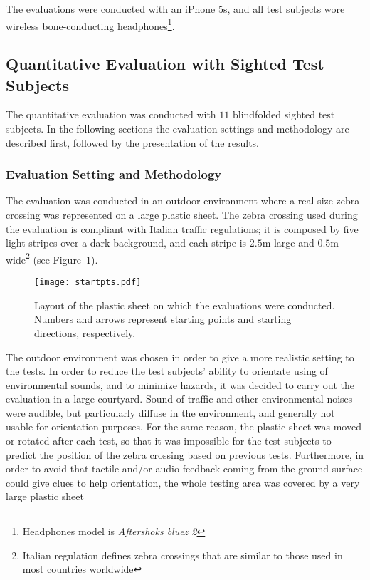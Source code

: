 \documentclass{article}
\begin{document}
The evaluations were conducted with an iPhone $5$s, and all test subjects wore wireless bone-conducting headphones\footnote{Headphones model is \emph{Aftershoks bluez 2}}.

\subsection{Quantitative Evaluation with Sighted Test Subjects}
\label{sub:quantitative}
The quantitative evaluation was conducted with $11$ blindfolded sighted test subjects.
In the following sections the evaluation settings and methodology are described first, followed by the presentation of the results.

\subsubsection{Evaluation Setting and Methodology}
The evaluation was conducted in an outdoor environment where a real-size zebra crossing was represented on a large plastic sheet.
The zebra crossing used during the evaluation is compliant with Italian traffic regulations; it is composed by five light stripes over a dark background, and each stripe is $2.5$m large and $0.5$m wide\footnote{Italian regulation defines zebra crossings that are similar to those used in most countries worldwide} (see Figure~\ref{fig:startpts}).

\begin{figure}[t!]
	\centering
		\texttt{[image: startpts.pdf]}
	\caption[]{Layout of the plastic sheet on which the evaluations were conducted. Numbers and arrows represent starting points and starting directions, respectively.}
	\label{fig:startpts}
\end{figure}

The outdoor environment was chosen in order to give a more realistic setting to the tests.
In order to reduce the test subjects' ability to orientate using of environmental sounds, and to minimize hazards, it was decided to carry out the evaluation in a large courtyard. Sound of traffic and other environmental noises were audible, but particularly diffuse in the environment, and generally not usable for orientation purposes.
For the same reason, the plastic sheet was moved or rotated after each test, so that it was impossible for the test subjects to predict the position of the zebra crossing based on previous tests.
Furthermore, in order to avoid that tactile and/or audio feedback coming from the ground surface could give clues to help orientation, the whole testing area was covered by a very large plastic sheet
\end{document}
